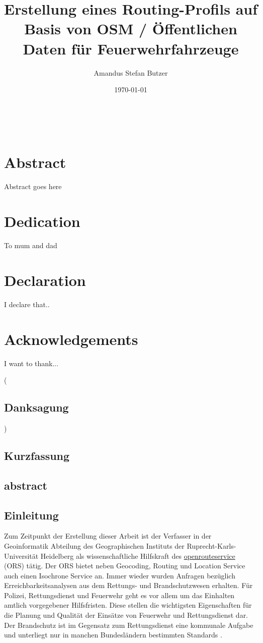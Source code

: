 \documentclass[10pt,a4paper]{report}
\author{Amandus Stefan Butzer}
\title{Erstellung eines Routing-Profils auf Basis von OSM / Öffentlichen Daten für Feuerwehrfahrzeuge}
\date{\today}
\begin{document}
\maketitle

\

\chapter*{Abstract}
Abstract goes here

\chapter*{Dedication}
To mum and dad

\chapter*{Declaration}
I declare that..

\chapter*{Acknowledgements}
I want to thank...

\tableofcontents

(\section{Danksagung})

\section{Kurzfassung}

\section{abstract}

\section{Einleitung}

Zum Zeitpunkt der Erstellung dieser Arbeit ist der Verfasser in der Geoinformatik Abteilung des Geographischen Instituts der Ruprecht-Karls-Universität Heidelberg als wissenschaftliche Hilfskraft des \href{http://www.openrouteservice.org}{openrouteservice} (ORS) tätig. Der ORS bietet neben Geocoding, Routing und Location Service auch einen Isochrone Service an. Immer wieder wurden Anfragen bezüglich Erreichbarkeitsanalysen aus dem Rettungs- und Brandschutzwesen erhalten. Für Polizei, Rettungsdienst und Feuerwehr geht es vor allem um das Einhalten amtlich vorgegebener Hilfsfristen. Diese stellen die wichtigsten Eigenschaften für die Planung und Qualität der Einsätze von Feuerwehr und Rettungsdienst dar. Der Brandschutz ist im Gegensatz zum Rettungsdienst eine kommunale Aufgabe und unterliegt nur in manchen Bundesländern bestimmten Standards \cite{brandschutz bedarfsplan}.
\end{document}
